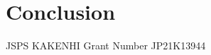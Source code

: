\documentclass{osa-article}
\begin{document}
\section{Conclusion}

\begin{backmatter}

JSPS KAKENHI Grant Number JP21K13944



\end{backmatter}








\end{document}
